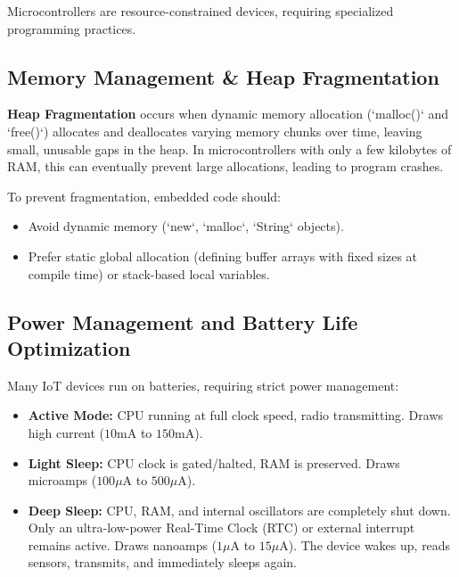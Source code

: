 \documentclass[12pt,a4paper]{article}
\begin{document}
Microcontrollers are resource-constrained devices, requiring specialized programming practices.

\subsection{Memory Management \& Heap Fragmentation}
\begin{tcolorbox}[defbox, title={Heap Fragmentation}]
  \textbf{Heap Fragmentation} occurs when dynamic memory allocation (`malloc()` and `free()`) allocates and deallocates varying memory chunks over time, leaving small, unusable gaps in the heap. In microcontrollers with only a few kilobytes of RAM, this can eventually prevent large allocations, leading to program crashes.
\end{tcolorbox}
To prevent fragmentation, embedded code should:
\begin{itemize}[leftmargin=*, itemsep=2.5pt]
  \item Avoid dynamic memory (`new`, `malloc`, `String` objects).
  \item Prefer static global allocation (defining buffer arrays with fixed sizes at compile time) or stack-based local variables.
\end{itemize}

\subsection{Power Management and Battery Life Optimization}
Many IoT devices run on batteries, requiring strict power management:
\begin{itemize}[leftmargin=*, itemsep=3pt]
  \item \textbf{Active Mode:} CPU running at full clock speed, radio transmitting. Draws high current ($10\text{mA}$ to $150\text{mA}$).
  \item \textbf{Light Sleep:} CPU clock is gated/halted, RAM is preserved. Draws microamps ($100\mu\text{A}$ to $500\mu\text{A}$).
  \item \textbf{Deep Sleep:} CPU, RAM, and internal oscillators are completely shut down. Only an ultra-low-power Real-Time Clock (RTC) or external interrupt remains active. Draws nanoamps ($1\mu\text{A}$ to $15\mu\text{A}$). The device wakes up, reads sensors, transmits, and immediately sleeps again.
\end{itemize}
\end{document}
